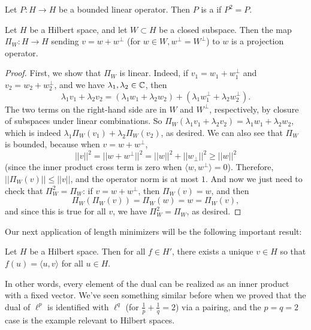 \begin{definition}
Let $P: H \to H$ be a bounded linear operator. Then $P$ is a  if $P^2 = P$.
\end{definition}

\begin{proposition}
Let $H$ be a Hilbert space, and let $W \subset H$ be a closed subspace. Then the map $\Pi_W: H \to H$ sending $v = w + w^\perp$ (for $w \in W, w^\perp = W^\perp$) to $w$ is a projection operator.
\end{proposition}
\begin{proof}
First, we show that $\Pi_W$ is linear. Indeed, if $v_1 = w_1 + w_1^\perp$ and $v_2 = w_2 + w_2^\perp$, and we have $\lambda_1, \lambda_2 \in \mathbb C$, then 
\[
    \lambda_1 v_1 + \lambda_2 v_2 = (\lambda_1 w_1 + \lambda_2 w_2) + (\lambda_1 w_1^\perp + \lambda_2 w_2^\perp).
\]
The two terms on the right-hand side are in $W$ and $W^\perp$, respectively, by closure of subspaces under linear combinations. So $\Pi_W(\lambda_1 v_1 + \lambda_2 v_2) = \lambda_1 w_1 + \lambda_2 w_2$, which is indeed $\lambda_1 \Pi_W(v_1) + \lambda_2 \Pi_W(v_2)$, as desired. We can also see that $\Pi_W$ is bounded, because when $v = w + w^\perp$, 
\[
    ||v||^2 = ||w + w^\perp||^2 = ||w||^2 + ||w_\perp||^2 \ge ||w||^2
\]
(since the inner product cross term is zero when $\langle w, w^\perp \rangle = 0$). Therefore, $||\Pi_W(v)|| \le ||v||$, and the operator norm is at most $1$. And now we just need to check that $\Pi_W^2 = \Pi_W$: if $v = w + w^\perp$, then $\Pi_W(v) = w$, and then 
\[
    \Pi_W(\Pi_W(v)) = \Pi_W(w) = w = \Pi_W(v),
\]
and since this is true for all $v$, we have $\Pi_W^2 = \Pi_W$, as desired.
\end{proof}

Our next application of length minimizers will be the following important result:

\begin{theorem}
Let $H$ be a Hilbert space. Then for all $f \in H'$, there exists a unique $v \in H$ so that $f(u) = \langle u, v \rangle$ for all $u \in H$. 
\end{theorem}

In other words, every element of the dual can be realized as an inner product with a fixed vector. We've seen something similar before when we proved that the dual of $\ell^p$ is identified with $\ell^q$ (for $\frac{1}{p} + \frac{1}{q} = 2$) via a pairing, and the $p = q = 2$ case is the example relevant to Hilbert spaces.

